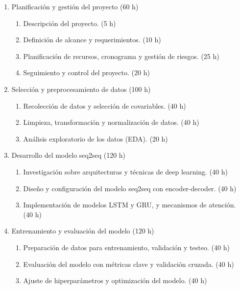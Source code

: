 \documentclass[
11pt, %
]{charter}
\begin{document}
%
\begin{enumerate}
	\item Planificación y gestión del proyecto (60 h)
	\begin{enumerate}
		\item Descripción del proyecto. (5 h)
		\item Definición de alcance y requerimientos. (10 h)
		\item Planificación de recursos, cronograma y gestión de riesgos. (25 h)
		\item Seguimiento y control del proyecto. (20 h)
	\end{enumerate}
	
	\item Selección y preprocesamiento de datos (100 h)
	\begin{enumerate}
		\item Recolección de datos y selección de covariables. (40 h)
		\item Limpieza, transformación y normalización de datos. (40 h)
		\item Análisis exploratorio de los datos (EDA). (20 h)
	\end{enumerate}
	
	\item Desarrollo del modelo seq2seq (120 h)
	\begin{enumerate}
		\item Investigación sobre arquitecturas y técnicas de deep learning. (40 h)
		\item Diseño y configuración del modelo seq2seq con encoder-decoder. (40 h)
		\item Implementación de modelos LSTM y GRU, y mecanismos de atención. (40 h)

	\end{enumerate}
	
	\item Entrenamiento y evaluación del modelo (120 h)
	\begin{enumerate}
		\item Preparación de datos para entrenamiento, validación y testeo. (40 h)
		\item Evaluación del modelo con métricas clave y validación cruzada. (40 h)
		\item Ajuste de hiperparámetros y optimización del modelo. (40 h)
	\end{enumerate}
	

\end{enumerate}
\end{document}
